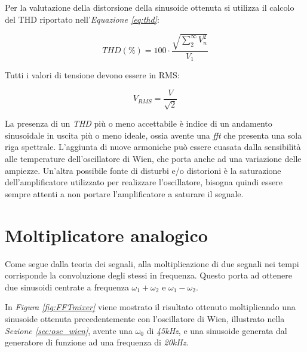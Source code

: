 \documentclass[titlepage]{report}
\begin{document}
	\noindent Per la valutazione della distorsione della sinusoide ottenuta si utilizza il calcolo del THD riportato nell'\textit{Equazione \ref{eq:thd}}:
	
	\begin{equation}
		\label{eq:thd}
		THD (\%) = 100 \cdot \frac{\sqrt{\sum_{2}^{\infty} V_{n}^2}}{V_1}
	\end{equation}

	Tutti i valori di tensione devono essere in RMS: 
	
	\begin{equation}
		\label{eq:Vrms}
		V_{RMS} = \frac{V}{\sqrt{2}}
	\end{equation}

	La presenza di un \textit{THD} più o meno accettabile è indice di un andamento sinusoidale in uscita più o meno ideale, ossia avente una \textit{fft} che presenta una sola riga spettrale. L'aggiunta di nuove armoniche può essere cuasata dalla sensibilità alle temperature dell'oscillatore di Wien, che porta anche ad una variazione delle ampiezze. Un'altra possibile fonte di disturbi e/o distorioni è la saturazione dell'amplificatore utilizzato per realizzare l'oscillatore, bisogna quindi essere sempre attenti a non portare l'amplificatore a saturare il segnale.


	
	
		
\newpage
\section{Moltiplicatore analogico}
	\label{sec:analog_multiplier}
	Come segue dalla teoria dei segnali, alla moltiplicazione di due segnali nei tempi corrisponde la convoluzione degli stessi in frequenza. Questo porta ad ottenere due sinusoidi centrate a frequenza $\omega_1 + \omega_2$ e $\omega_1 - \omega_2$.
	
	\noindent In \textit{Figura \ref{fig:FFTmixer}} viene mostrato il risultato ottenuto moltiplicando una sinusoide ottenuta precedentemente con l'oscillatore di Wien, illustrato nella \textit{Sezione \ref{sec:osc_wien}}, avente una $\omega_0$ di \textit{45kHz}, e una sinusoide generata dal generatore di funzione ad una frequenza di \textit{20kHz}.
\end{document}
